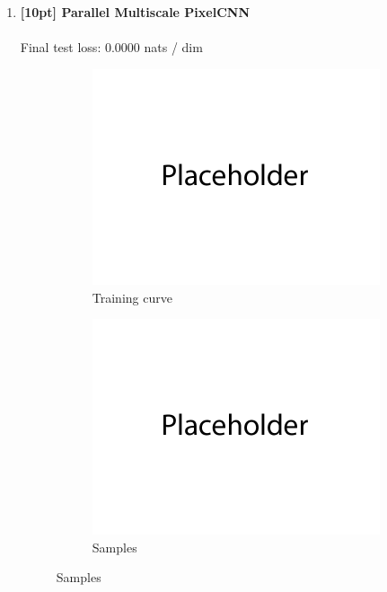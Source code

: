 \documentclass{article}
\begin{document}
\begin{enumerate}
\begin{figure}[H]
\begin{subfigure}{0.45\textwidth}
        \caption{Samples}
    \end{subfigure}
\end{figure}
\newpage
\item {\bf [10pt] Parallel Multiscale PixelCNN} \\\\
Final test loss: 0.0000  nats / dim
\begin{figure}[H]
    \centering
    \begin{subfigure}{0.45\textwidth}
        \centering
        \includegraphics[width=\textwidth]{figures/q4_d_train_plot.png}
        \caption{Training curve}
    \end{subfigure}
    \hspace{0.2in}
    \begin{subfigure}{0.45\textwidth}
        \centering
        \includegraphics[width=\textwidth]{figures/q4_d_samples.png}
        \caption{Samples}
    \end{subfigure}
\end{figure}
\end{enumerate}
\end{document}
